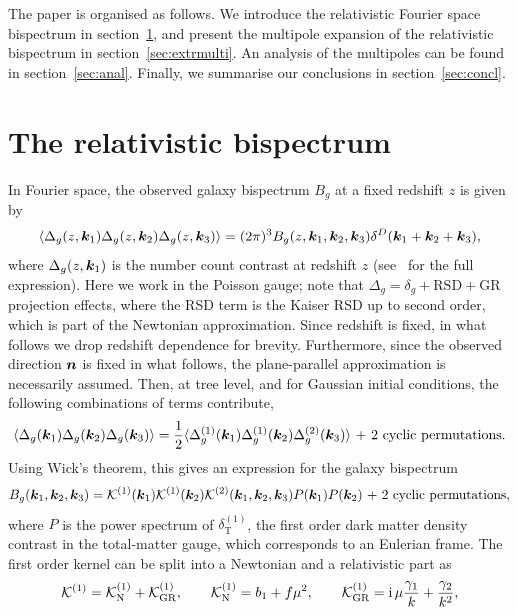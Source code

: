 The paper is organised as follows. We introduce the relativistic Fourier space bispectrum in section~\ref{sec:relbisp}, and present the multipole expansion of the relativistic bispectrum in section~\ref{sec:extrmulti}. An analysis of the multipoles can be found in section~\ref{sec:anal}. Finally, we summarise our conclusions in section~\ref{sec:concl}.

\section{The relativistic bispectrum}\label{sec:relbisp}

In Fourier space, the observed galaxy bispectrum \(B_g\) at a fixed redshift \(z\) is given by~\cite{Jolicoeur:2017nyt,Jolicoeur:2017eyi}
\begin{equation}
	\langle \Delta_g(z,\bm {k}_1) \Delta_g(z,\bm {k}_2) \Delta_g(z,\bm {k}_3) \rangle = (2\pi)^3 B_g(z,\bm {k}_1,\bm {k}_2,\bm {k}_3) \delta^D(\bm {k}_1+\bm {k}_2+\bm {k}_3),
\end{equation}
where \(\Delta_g(z, \bm {k}_1)\) is the number count contrast at redshift \(z\) (see~\cite{Jolicoeur:2017nyt} for the full expression). Here we work in the Poisson gauge; note that \(\Delta_g = \delta_g + \text{RSD}+\text{GR}\) projection effects, where the RSD term is the Kaiser RSD up to second order, which is part of the Newtonian approximation. Since redshift is fixed, in what follows we drop redshift dependence for brevity. Furthermore, since the observed direction \(\bm {n}\) is fixed in what follows, the plane-parallel approximation is necessarily assumed. Then, at tree level, and for Gaussian initial conditions, the following combinations of terms contribute, 
\begin{equation}
\langle \Delta_g(\bm {k}_1)\Delta_g(\bm {k}_2)\Delta_g(\bm {k}_3) \rangle = \frac{1}{2} \langle \Delta_g^{(1)}(\bm {k}_1)\Delta_g^{(1)}(\bm {k}_2)\Delta_g^{(2)}(\bm {k}_3)\rangle \text{ + 2 cyclic permutations.}
\end{equation}
Using Wick's theorem, this gives an expression for the galaxy bispectrum ~\cite{Jolicoeur:2017nyt}
\begin{equation}
B_g(\bm {k}_1, \bm {k}_2,\bm {k}_3)= \mathcal{K}^{(1)}(\bm {k}_1) \mathcal{K}^{(1)}(\bm {k}_2) \mathcal{K}^{(2)}(\bm {k}_1,\bm {k}_2,\bm {k}_3)P(\bm {k}_1) P(\bm {k}_2)\text{ + 2 cyclic permutations},
\end{equation}
where \(P\) is the power spectrum of \(\delta_\mathrm{T}^{(1)}\), the first order dark matter density contrast in the total-matter gauge, which corresponds to an Eulerian frame. The first order kernel can be split into a Newtonian and a relativistic part as~\cite{Jeong:2011as}
\begin{equation}
\mathcal{K}^{(1)} = \mathcal{K}^{(1)}_\mathrm{N} + \mathcal{K}^{(1)}_\mathrm{GR}, \qquad \mathcal{K}^{(1)}_\mathrm{N}= b_1 + f \mu^2, \qquad \mathcal{K}^{(1)}_\mathrm{GR} = \mathrm{i\,} \mu \frac{\gamma_1}{k} + \frac{\gamma_2}{k^2}, 
\end{equation}
